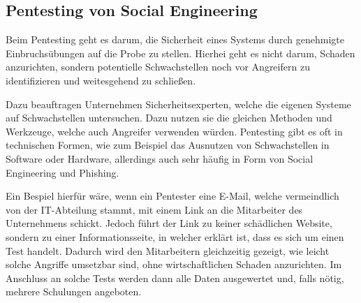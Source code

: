 \documentclass[12pt, a4paper, oneside]{scrartcl}
\begin{document}
\subsection{Pentesting von Social Engineering}
Beim Pentesting geht es darum, die Sicherheit eines Systems durch genehmigte Einbruchsübungen auf die 
Probe zu stellen. Hierhei geht es nicht darum, Schaden anzurichten, sondern potentielle Schwachstellen
noch vor Angreifern zu identifizieren und weitesgehend zu schließen.
\par
Dazu beauftragen Unternehmen Sicherheitsexperten, welche die eigenen Systeme auf Schwachstellen untersuchen.
Dazu nutzen sie die gleichen Methoden und Werkzeuge, welche auch Angreifer verwenden würden. Pentesting gibt
es oft in technischen Formen, wie zum Beispiel das Ausnutzen von Schwachstellen in Software oder Hardware,
allerdings auch sehr häufig in Form von Social Engineering und Phishing.
\par
Ein Bespiel hierfür wäre, wenn ein Pentester eine E-Mail, welche vermeindlich von der IT-Abteilung stammt,
mit einem Link an die Mitarbeiter des Unternehmens schickt. Jedoch führt der Link zu keiner schädlichen Website, sondern
zu einer Informationsseite, in welcher erklärt ist, dass es sich um einen Test handelt. Dadurch wird 
den Mitarbeitern gleichzeitig gezeigt, wie leicht solche Angriffe umsetzbar sind, ohne wirtschaftlichen Schaden
anzurichten. Im Anschluss an solche Tests werden dann alle Daten ausgewertet und, falls nötig, mehrere Schulungen angeboten.
\end{document}

